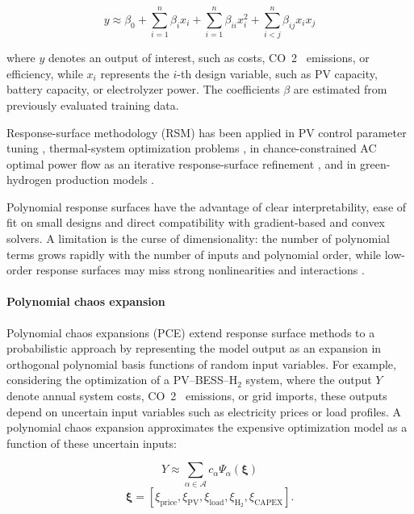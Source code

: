 \documentclass[final,5p,times,twocolumn]{elsarticle}
\begin{document}
$$\begin{equation}
 y \approx \beta_0 + \sum_{i=1}^{n} \beta_i x_i + \sum_{i=1}^{n} \beta_{ii} x_i^2 + \sum_{i<j}^{n} \beta_{ij} x_i x_j
\end{equation}$$

where $y$ denotes an output of interest, such as costs, CO~2~ emissions,
or efficiency, while $x_i$ represents the $i$-th design variable, such
as PV capacity, battery capacity, or electrolyzer power. The
coefficients $\beta$ are estimated from previously evaluated training
data.

Response-surface methodology (RSM) has been applied in PV control
parameter tuning \cite{Hasanien2018168}, thermal-system optimization
problems \cite{Sami20181416,Ahmad202451,Sun2020}, in chance-constrained
AC optimal power flow as an iterative response-surface refinement
\cite{Xu20212696}, and in green-hydrogen production models
\cite{Ahmad202451}.

Polynomial response surfaces have the advantage of clear
interpretability, ease of fit on small designs and direct compatibility
with gradient-based and convex solvers. A limitation is the curse of
dimensionality: the number of polynomial terms grows rapidly with the
number of inputs and polynomial order, while low-order response surfaces
may miss strong nonlinearities and interactions
\cite{Torun20192128,Hasanien2018168}.

\paragraph{Polynomial chaos expansion}

Polynomial chaos expansions (PCE) extend response surface methods to a
probabilistic approach by representing the model output as an expansion
in orthogonal polynomial basis functions of random input variables. For
example, considering the optimization of a PV--BESS--H$_2$ system, where
the output $Y$ denote annual system costs, CO~2~ emissions, or grid
imports, these outputs depend on uncertain input variables such as
electricity prices or load profiles. A polynomial chaos expansion
approximates the expensive optimization model as a function of these
uncertain inputs:

$$\begin{equation}
 Y \approx \sum_{\alpha \in \mathcal{A}} c_{\alpha} \Psi_{\alpha}(\boldsymbol{\xi})
\end{equation}$$ $$\begin{equation}
 \boldsymbol{\xi} = \left[ \xi_{\mathrm{price}}, \xi_{\mathrm{PV}}, \xi_{\mathrm{load}}, \xi_{\mathrm{H_2}}, \xi_{\mathrm{CAPEX}} \right].
\end{equation}$$
\end{document}
